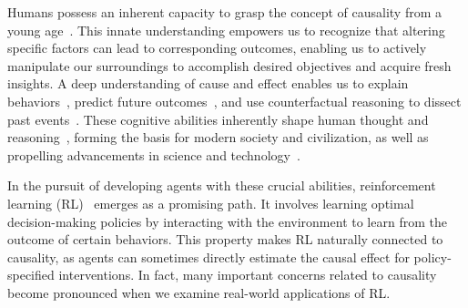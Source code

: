 \documentclass[10pt]{article} %
\theoremstyle{definition}
\begin{document}
Humans possess an inherent capacity to grasp the concept of causality from a young age~\citep{wellmanChildTheoryMind1992, inagakiYoungChildrenUnderstanding1993, koslowskiDevelopmentCausalReasoning2002, sobelImportanceDiscoveryChildren2010}. 
This innate understanding empowers us to recognize that altering specific factors can lead to corresponding outcomes, enabling us to actively manipulate our surroundings to accomplish desired objectives and acquire fresh insights. 
A deep understanding of cause and effect enables us to explain behaviors~\citep{schultExplainingHumanMovements1997}, predict future outcomes~\citep{shultzRulesCausalAttribution1982}, and use counterfactual reasoning to dissect past events~\citep{harrisChildrenUseCounterfactual1996}. 
These cognitive abilities inherently shape human thought and reasoning~\citep{slomanCausalModelsHow2005,slomanCausalityThought2015,pearlCausality2009,pearlBookWhyNew2018}, forming the basis for modern society and civilization, as well as propelling advancements in science and technology~\citep{glymourRevsiewArtCausal1998}. 

In the pursuit of developing agents with these crucial abilities, reinforcement learning (RL)~\citep{suttonReinforcementLearningIntroduction2018}  emerges as a promising path.
It involves learning optimal decision-making policies by interacting with the environment to learn from the outcome of certain behaviors. 
This property makes RL naturally connected to causality, as agents can sometimes directly estimate the causal effect for policy-specified interventions. 
In fact, many important concerns related to causality become pronounced when we examine real-world applications of RL.
\end{document}
